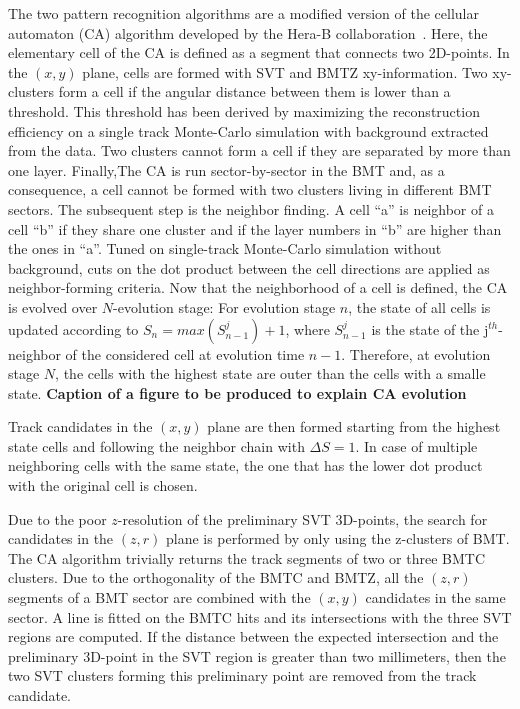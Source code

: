 \documentclass{elsart}
\begin{document}
The two pattern recognition algorithms are a modified version of the cellular automaton (CA) algorithm developed by the 
Hera-B collaboration~\cite{CA-HeraB}. Here, the elementary cell of the CA is defined as a segment that connects two 
2D-points.
In the $(x,y)$ plane, cells are formed with SVT and BMTZ xy-information. Two xy-clusters form a cell if the angular 
distance between them is lower than a threshold. This threshold has been derived by maximizing the reconstruction 
efficiency on a single track Monte-Carlo simulation with background extracted from the data. Two clusters cannot form a 
cell if they are separated by more than one layer. Finally,The CA is run sector-by-sector in the BMT and, as a 
consequence, a cell cannot be formed with two clusters living in different BMT sectors. 
The subsequent step is the neighbor finding. A cell ``a'' is neighbor of a cell ``b'' if they share one cluster and if
the layer numbers in ``b'' are higher than the ones in ``a''. Tuned on single-track Monte-Carlo simulation without 
background, cuts on the dot product between the cell directions are applied  as neighbor-forming criteria.
Now that the neighborhood of a cell is defined, the CA is evolved over $N$-evolution stage: For evolution stage $n$, 
the state of all cells is updated according to $S_n = max(S_{n-1}^j) + 1$, where $S_{n-1}^j$ is the state of the 
j$^{th}$-neighbor of the considered cell at evolution time $n-1$. Therefore, at evolution stage $N$, the cells with the 
highest state are outer than the cells with a smalle state.
\color{red} \textbf{Caption of a figure to be produced to explain CA evolution} \color{black}

Track candidates in the $(x,y)$ plane are then formed starting from the highest state cells and following the neighbor 
chain with $\Delta S = 1$. In case of multiple neighboring cells with the same state, the one that has the lower dot 
product with the original cell is chosen.

Due to the poor $z$-resolution of the preliminary SVT 3D-points, the search for candidates in the $(z,r)$ plane is 
performed by only using 
the z-clusters of BMT. The CA algorithm trivially returns the track segments of two or three BMTC clusters.
Due to the orthogonality of the BMTC and BMTZ, all the $(z,r)$ segments of a BMT sector are combined with the $(x,y)$ 
candidates in the same sector. A line is fitted on the BMTC hits and its intersections with the three SVT regions are 
computed. If the distance between the expected intersection and the preliminary 3D-point in the SVT region is greater 
than two millimeters, then the two SVT clusters forming this preliminary point are removed from the track candidate.
\end{document}
